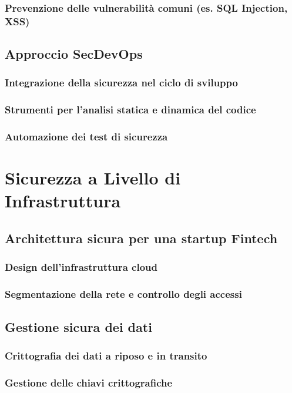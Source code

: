 \documentclass[a4paper,12pt]{book}
\begin{document}
\subsection{Prevenzione delle vulnerabilità comuni (es. SQL Injection, XSS)}
\section{Approccio SecDevOps}
\subsection{Integrazione della sicurezza nel ciclo di sviluppo}
\subsection{Strumenti per l'analisi statica e dinamica del codice}
\subsection{Automazione dei test di sicurezza}

\chapter{Sicurezza a Livello di Infrastruttura}
\section{Architettura sicura per una startup Fintech}
\subsection{Design dell'infrastruttura cloud}
\subsection{Segmentazione della rete e controllo degli accessi}
\section{Gestione sicura dei dati}
\subsection{Crittografia dei dati a riposo e in transito}
\subsection{Gestione delle chiavi crittografiche}
\end{document}
